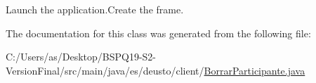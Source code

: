 Launch the application.\+Create the frame. 

The documentation for this class was generated from the following file\+:\begin{DoxyCompactItemize}
\item 
C\+:/\+Users/as/\+Desktop/\+B\+S\+P\+Q19-\/\+S2-\/\+Version\+Final/src/main/java/es/deusto/client/\mbox{\hyperlink{_borrar_participante_8java}{Borrar\+Participante.\+java}}\end{DoxyCompactItemize}
